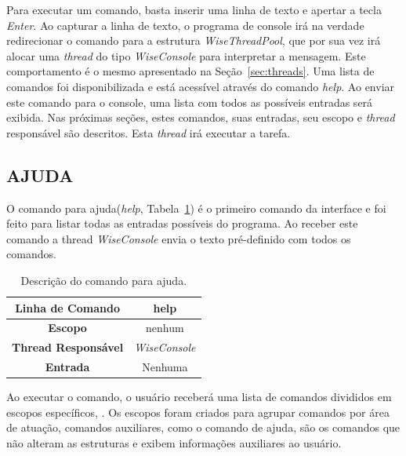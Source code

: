 Para executar um comando, basta inserir uma linha de texto e apertar a tecla \textit{Enter}.  Ao capturar a linha de texto, o programa de console irá na verdade redirecionar o comando para a estrutura \textit{WiseThreadPool}, que por sua vez irá alocar uma \textit{thread} do tipo \textit{WiseConsole} para interpretar a mensagem. Este comportamento é o mesmo apresentado na Seção~\ref{sec:threads}. Uma lista de comandos foi disponibilizada e está acessível através do comando \textit{help}. Ao enviar este comando para o console, uma lista com todos as possíveis entradas será exibida. Nas próximas seções, estes comandos, suas entradas, seu escopo e \textit{thread} responsável são descritos. Esta \textit{thread} irá executar a tarefa. 

\subsection{AJUDA}\label{sec:help}

O comando para ajuda(\textit{help}, Tabela~\ref{tab:help}) é o primeiro comando da interface e foi feito para listar todas as entradas possíveis do programa. Ao receber este comando a thread \textit{WiseConsole} envia o texto pré-definido com todos os comandos.

\begin{center}
	\begin{table}[!htbp]
		\begin{tabularx}{\textwidth}{c|X}
			\toprule
			\textbf{Linha de Comando} & \multicolumn{1}{c}{help} \\
			\midrule
			\textbf{Escopo} & \multicolumn{1}{c}{nenhum} \\
			\hline
			\textbf{Thread Responsável} & \multicolumn{1}{c}{\textit{WiseConsole}} \\
			\hline
			\textbf{Entrada} & \multicolumn{1}{c}{Nenhuma} \\
			\bottomrule
		\end{tabularx}
		\caption{Descrição do comando para ajuda.}
		\label{tab:help}
	\end{table}
\end{center}

Ao executar o comando, o usuário receberá uma lista de comandos divididos em escopos específicos, . Os escopos foram criados para agrupar comandos por área de atuação, comandos auxiliares, como o comando de ajuda, são os comandos que não alteram as estruturas e exibem informações auxiliares ao usuário.


